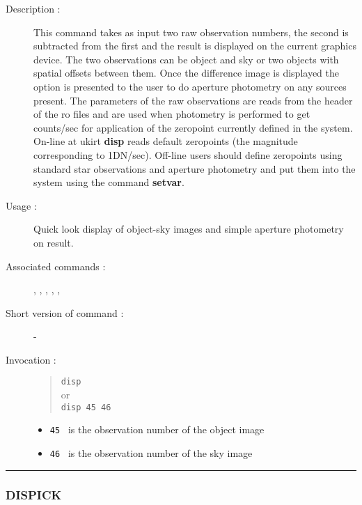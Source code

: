 \begin{description}

\item[Description :] This command takes as input two raw observation
numbers, the second is subtracted from the first and the result is
displayed on the current graphics device.  The two observations can be
object and sky or two objects with spatial offsets between them.  Once
the difference image is displayed the option is presented to the user
to do aperture photometry on any sources present.  The parameters of
the raw observations are reads from the header of the {\sc ro} files
and are used when photometry is performed to get counts/sec for
application of the zeropoint currently defined in the system.  On-line
at {\sc ukirt} {\bf disp} reads default zeropoints (the magnitude
corresponding to 1DN/sec).  Off-line users should define zeropoints
using standard star observations and aperture photometry and put them
into the system using the command {\bf setvar}.

\item[Usage :] Quick look display of object-sky images and simple
aperture photometry on result.
\item[Associated commands :] {\tt {}},
{\tt {}}, {\tt {}},
{\tt {}}, {\tt {}},
{\tt {}}
\item[Short version of command :] -
\item[Invocation :]

\begin{quote}{\tt  disp }\\
or \\
{\tt disp 45 46 }
\end{quote}

\begin{itemize}

\item {\tt 45 } is the observation number of the object image
\item {\tt 46 } is the observation number of the sky image
\end{itemize}

\end{description}

\hrule
\subsubsection*{\label{DISPICK}DISPICK}

